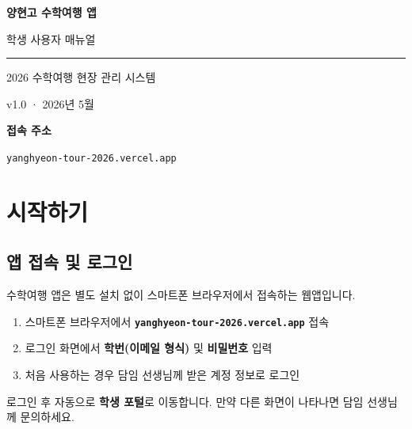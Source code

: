 \documentclass[a4paper,11pt]{article}
\begin{document}
\begin{titlepage}
  \centering
  \vspace*{3cm}
  {\Huge\bfseries\color{primary} 양현고 수학여행 앱}\par\vspace{0.5cm}
  {\LARGE 학생 사용자 매뉴얼}\par\vspace{1cm}
  \textcolor{gray}{\rule{8cm}{0.5pt}}\par\vspace{1cm}
  {\large 2026 수학여행 현장 관리 시스템}\par\vspace{0.5cm}
  {\normalsize\color{gray} v1.0 · 2026년 5월}\par
  \vfill
  \begin{tcolorbox}[colback=lightblue, colframe=primary, arc=6pt,
    boxrule=1pt, width=10cm]
    \centering
    \textbf{접속 주소}\par\vspace{0.3em}
    {\large\color{primary}\texttt{yanghyeon-tour-2026.vercel.app}}
  \end{tcolorbox}
\end{titlepage}

\tableofcontents
\newpage

\section{시작하기}

\subsection{앱 접속 및 로그인}

수학여행 앱은 별도 설치 없이 스마트폰 브라우저에서 접속하는 웹앱입니다.

\begin{enumerate}
  \item 스마트폰 브라우저에서 \textbf{\texttt{yanghyeon-tour-2026.vercel.app}} 접속
  \item 로그인 화면에서 \textbf{학번(이메일 형식)} 및 \textbf{비밀번호} 입력
  \item 처음 사용하는 경우 담임 선생님께 받은 계정 정보로 로그인
\end{enumerate}

\begin{tcolorbox}[warnbox]
로그인 후 자동으로 \textbf{학생 포털}로 이동합니다. 만약 다른 화면이 나타나면 담임 선생님께 문의하세요.
\end{tcolorbox}
\end{document}

